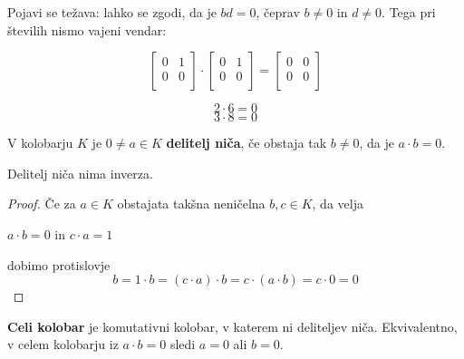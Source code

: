 \documentclass[11pt, a4paper]{article}
\begin{document}
    Pojavi se težava: lahko se zgodi, da je \(bd = 0\), čeprav \(b \neq 0\) in \(d \neq 0\). Tega pri številih nismo vajeni vendar:
    \begin{example}[Matrike]
        \[
            \begin{bmatrix}
                0 & 1 \\
                0 & 0 \\
            \end{bmatrix}
            \cdot
            \begin{bmatrix}
                0 & 1 \\
                0 & 0 \\
            \end{bmatrix}
            =
            \begin{bmatrix}
                0 & 0 \\
                0 & 0 \\
            \end{bmatrix}
        \]
    \end{example}

    \begin{example}
        \[2 \cdot 6 = 0\]
        \[3 \cdot 8 = 0\]
    \end{example}
    
    \begin{definition}
        V kolobarju \(K\) je \(0 \neq a \in K\) \textbf{delitelj niča}, če obstaja tak \(b \neq 0\), da je \(a \cdot b = 0\).
    \end{definition}

    \begin{proposition}
        Delitelj niča nima inverza.
    \end{proposition}

    \begin{proof}
        Če za \(a \in K\) obstajata takšna neničelna \(b,c \in K\), da velja
        \begin{center}
            \(a \cdot b = 0\) in \(c \cdot a = 1\)
        \end{center}
        dobimo protislovje
        \[b = 1 \cdot b = (c\cdot a) \cdot b = c \cdot (a \cdot b) = c \cdot 0 = 0\]
    \end{proof}

    \begin{definition}
        \textbf{Celi kolobar} je komutativni kolobar, v katerem ni deliteljev niča. Ekvivalentno, v celem kolobarju iz \(a \cdot b = 0\) sledi \(a = 0\) ali \(b = 0\).
    \end{definition}
\end{document}

